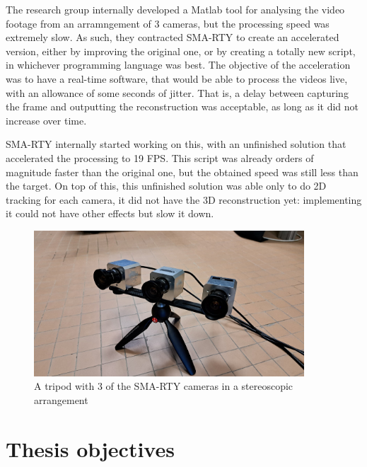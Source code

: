 The research group internally developed a Matlab tool for analysing the video footage from an arramngement of 3 cameras, but the processing speed was extremely slow.
As such, they contracted SMA-RTY to create an accelerated version, either by improving the original one, or by creating a totally new script, in whichever programming language was best.
The objective of the acceleration was to have a real-time software, that would be able to process the videos live, with an allowance of some seconds of jitter.
That is, a delay between capturing the frame and outputting the reconstruction was acceptable, as long as it did not increase over time.

SMA-RTY internally started working on this, with an unfinished solution that accelerated the processing to 19 FPS.
This script was already orders of magnitude faster than the original one, but the obtained speed was still less than the target.
On top of this, this unfinished solution was able only to do 2D tracking for each camera, it did not have the 3D reconstruction yet: implementing  it could not have other effects but slow it down.

\begin{figure}
	\centerline{\includegraphics[width=0.9\textwidth]{images/cameras.jpg}}
	\caption{\centering A tripod with 3 of the SMA-RTY cameras in a stereoscopic arrangement}
	\label{fig:camera-setup}
\end{figure}

\section{Thesis objectives}
